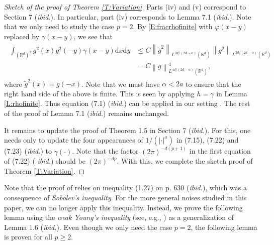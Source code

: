 \documentclass[a4paper,11pt]{article}
\numberwithin{equation}{section}
\numberwithin{equation}{section}
\theoremstyle{plain}
\theoremstyle{definition}
\newcommand{\ud}{\ensuremath{\mathrm{d} }}
\newcommand{\Norm}[1]{\left\|  #1   \right\|}
\newcommand{\R}{\mathbb{R}}
\begin{document}
\begin{proof}[Sketch of the proof of Theorem \ref{T:Variation}]
  Parts (iv) and (v) correspond to Section 7 ({\it ibid.}). In particular, part (iv) corresponds to
  Lemma 7.1 ({\it ibid.}). Note that we only need to study the case $p=2$. By
  \eqref{E:fracrhofinite} with $\varphi(x-y)$ replaced by $\gamma(x-y)$, we see that
  \begin{align} \label{E:(7.1)}
    \begin{aligned}
      \int_{(\R^d)^2} g^2(x)g^2(-y) \gamma(x-y) \ud x \ud y
      & \le  C \Norm{\tilde{g}^2}_{L^{2d/(2d-\alpha)}(\R^d)} \Norm{g^2}_{L^{2d/(2d-\alpha)}(\R^d)} \\
      & =    C \Norm{g}_{L^{4d/(2d-\alpha)}(\R^d)}^4,
    \end{aligned}
  \end{align}
  where $\tilde{g}^2(x) = g(-x)$. Note that we must have $\alpha < 2a$ to ensure that the right hand
  side of the above is finite. This is seen by applying $h=\gamma$ in Lemma \ref{L:rhofinite}. Thus
  equation (7.1) ({\it ibid.}) can be applied in our setting . The rest of the proof of Lemma 7.1
  ({\it ibid.}) remains unchanged.

  It remains to update the proof of Theorem 1.5 in Section 7 ({\it ibid.}). For this, one needs only
  to update the four appearances of $1/(|\cdot|^\sigma)$ in (7.15), (7.22) and (7.23) ({\it ibid.}) to
  $\gamma(\cdot)$. Note that the factor $(2\pi)^{-d(p+1)}$ in the first equation  of (7.22) ({\it
  ibid.}) should be $(2\pi)^{-dp}$. With this, we complete the sketch proof of Theorem
  \ref{T:Variation}.
\end{proof}

Note that the proof of \cite[Lemma 1.6]{BCR09} relies on inequality (1.27) on p.  630 ({\it ibid.}),
which was a consequence of {\it Sobolev's inequality}. For the more general noises studied in this
paper, we can no longer apply this inequality. Instead, we prove the following lemma using the {\it
weak Young's inequality} (see, e.g., \cite[p.107]{LiebLoss01}) as a generalization of Lemma 1.6
({\it ibid.}).  Even though we only need the case $p=2$, the following lemma is proven for all $p\ge
2$.
\end{document}
